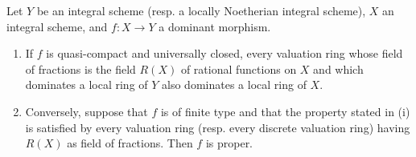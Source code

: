 \begin{corollary}[7.3.10]
\label{II.7.3.10}
Let $Y$ be an integral scheme \textup{(resp.} a locally Noetherian integral scheme),
$X$ an integral scheme, and $f:X\to Y$ a dominant morphism.
\begin{enumerate}
\item[\rm (i)] If $f$ is quasi-compact and universally closed, every valuation
ring whose field of fractions is the field $R(X)$ of rational functions
on $X$ and which dominates a local ring of $Y$ also dominates a
local ring of $X$.
\item[\rm (ii)] Conversely, suppose that $f$ is of finite type and that the
property stated in \textup{(i)} is satisfied by every valuation ring \textup{(resp.}
every discrete valuation ring) having $R(X)$ as field of fractions.
Then $f$ is proper.
\end{enumerate}
\end{corollary}

